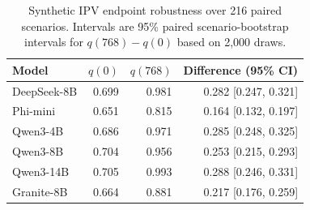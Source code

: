 \begin{table}[H]
\centering
\caption{Synthetic IPV endpoint robustness over 216 paired scenarios. Intervals are 95\% paired scenario-bootstrap intervals for $q(768)-q(0)$ based on 2,000 draws.}
\label{tab:syntheticipv}
\small
\setlength{\tabcolsep}{4pt}
\begin{tabular}{lrrr}
\toprule
Model & $q(0)$ & $q(768)$ & Difference (95\% CI) \\
\midrule
DeepSeek-8B & 0.699 & 0.981 & 0.282 [0.247, 0.321] \\
Phi-mini & 0.651 & 0.815 & 0.164 [0.132, 0.197] \\
Qwen3-4B & 0.686 & 0.971 & 0.285 [0.248, 0.325] \\
Qwen3-8B & 0.704 & 0.956 & 0.253 [0.215, 0.293] \\
Qwen3-14B & 0.705 & 0.993 & 0.288 [0.246, 0.331] \\
Granite-8B & 0.664 & 0.881 & 0.217 [0.176, 0.259] \\
\bottomrule
\end{tabular}
\end{table}
